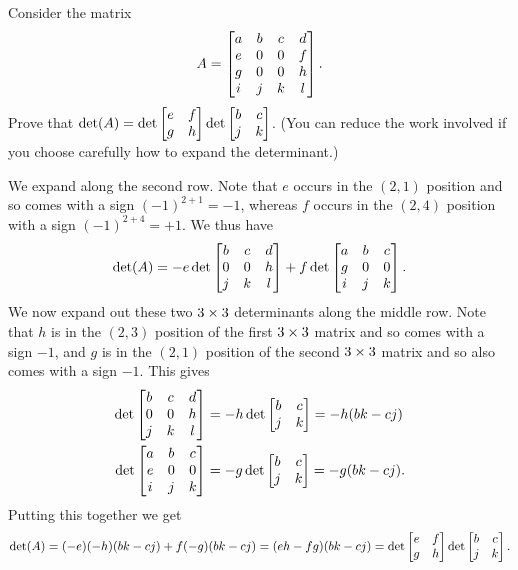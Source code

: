 \documentclass[a4paper]{amsart}
\renewenvironment{solution}{\SolutionInline}{\endSolutionInline}
\begin{document}
\begin{exercise}\label{ex-det-ii}
 Consider the matrix
 \[ A = \left[\begin{matrix} a & b & c & d \\
             e & 0 & 0 & f \\
             g & 0 & 0 & h \\
             i & j & k & l \end{matrix}\right].
 \]
 Prove that $\det(A)=\det\left[\begin{matrix} e&f\\g&h\end{matrix}\right]\det\left[\begin{matrix} b&c\\j&k\end{matrix}\right]$.
 (You can reduce the work involved if you choose carefully how to
 expand the determinant.)
\end{exercise}
\begin{solution}
 We expand along the second row.  Note that $e$ occurs in the $(2,1)$
 position and so comes with a sign $(-1)^{2+1}=-1$, whereas $f$ occurs
 in the $(2,4)$ position with a sign $(-1)^{2+4}=+1$.  We thus have
 \[ \det(A) = -e\det\left[\begin{matrix} b&c&d \\ 0&0&h \\ j&k&l \end{matrix}\right]
              +f\det\left[\begin{matrix} a&b&c \\ g&0&0 \\ i&j&k \end{matrix}\right].
 \]
 We now expand out these two $3\times 3$ determinants along the middle
 row.  Note that $h$ is in the $(2,3)$ position of the first $3\times 3$
 matrix and so comes with a sign $-1$, and $g$ is in the $(2,1)$
 position of the second $3\times 3$ matrix and so also comes with a sign
 $-1$.  This gives 
 \begin{align*}
  \det\left[\begin{matrix} b&c&d \\ 0&0&h \\ j&k&l \end{matrix}\right]
   &= -h \det\left[\begin{matrix} b&c\\ j&k \end{matrix}\right] = -h(bk-cj) \\
  \det\left[\begin{matrix} a&b&c \\ e&0&0 \\ i&j&k \end{matrix}\right]
   &= -g \det\left[\begin{matrix} b&c\\ j&k \end{matrix}\right] = -g(bk-cj).
 \end{align*}
 Putting this together we get 
 \[ \det(A) = (-e)(-h)(bk-cj) +f(-g)(bk-cj)
            = (eh-fg)(bk-cj) 
            = \det\left[\begin{matrix} e&f\\g&h\end{matrix}\right]\det\left[\begin{matrix} b&c\\j&k\end{matrix}\right].
 \]
\end{solution}
\end{document}
